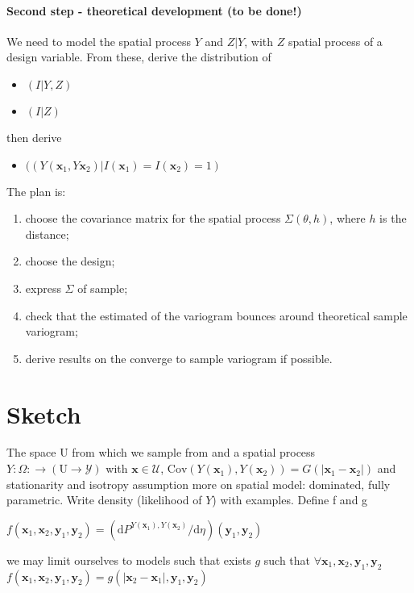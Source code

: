 \documentclass[12pt]{article}
\theoremstyle{definition}
\theoremstyle{remark}
\newcommand{\range}[1]{\mathscr{#1}}
\newcommand{\dominantY}{\eta}
\newcommand{\Cov}{\mathrm{Cov}}
\newcommand{\Semivariogram}{G}
\newcommand{\Pop}{\mathrm{U}}
\newcommand{\position}{\mathbf{x}}
\newcommand{\Signal}{Y}
\newcommand{\signal}{\mathbf{y}}
\begin{document}
\paragraph{Second step - theoretical development (to be done!)}
We need to model the spatial process $Y$ and $Z|Y$, with $Z$ spatial process of a design variable. From these, derive the distribution of 
\begin{itemize}
    \item $(I|Y,Z)$
    \item $(I|Z)$
\end{itemize}
then derive
\begin{itemize}
    \item $((Y(\textbf{x}_{1},Y\textbf{x}_{2})|I(\textbf{x}_{1})=I(\textbf{x}_{2})=1)$
\end{itemize}

The plan is:
\begin{enumerate}
    \item choose the covariance matrix for the spatial process $\Sigma(\theta,h)$, where $h$ is the distance;
    \item choose the design;
    \item express $\Sigma$ of sample;
    \item check that the estimated of the variogram bounces around theoretical sample variogram;
    \item derive results on the converge to sample variogram if possible.
\end{enumerate}



\section{Sketch}
The space $\Pop$ from which we sample from and a spatial process $Y:\Omega:\to \left(\Pop\to\range{Y}\right)$ with $\position\in\range{U}$, $\Cov\left(\Signal(\position_{1}), \Signal(\position_{2})\right)=\Semivariogram\left(\left|\position_{1}-\position_{2}\right|\right)$ and stationarity and isotropy assumption {\color{red}more on spatial model: dominated, fully parametric. Write density (likelihood of $Y$) with examples. Define f and g}

 $f(\position_1,\position_2,\signal_1,\signal_2)=\left(\mathrm{d}P^{\Signal(\position_1),\Signal(\position_2)}/\mathrm{d}\dominantY\right)(\signal_1,\signal_2)$
    
    we may limit ourselves to models such that exists $g$ such that 
    $\forall \position_1,\position_2,\signal_1,\signal_2$    $f(\position_1,\position_2,\signal_1,\signal_2)=g(\left|\position_2-\position_1\right|,\signal_1,\signal_2)$
    
\end{document}
